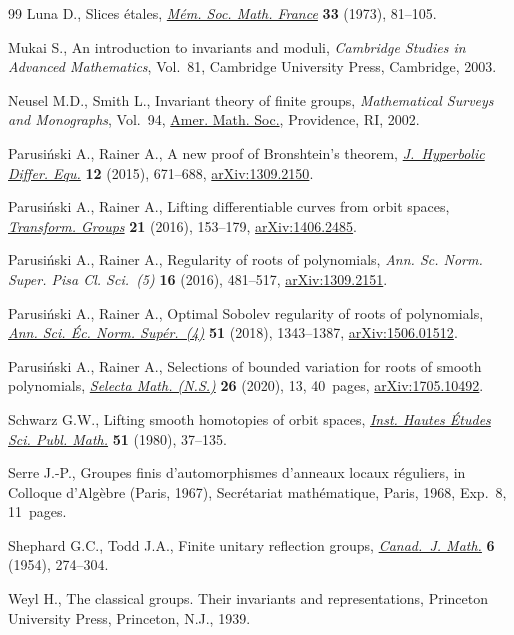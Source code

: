 \documentclass[pdftex]{sigma}
\numberwithin{equation}{section}
\begin{document}
\begin{thebibliography}{99}
Luna D., Slices \'etales, \href{https://doi.org/10.24033/msmf.110}{\textit{M\'em. Soc. Math. France}} \textbf{33} (1973),
 81--105.

Mukai S., An introduction to invariants and moduli, \textit{Cambridge Studies
 in Advanced Mathematics}, Vol.~81, Cambridge University Press, Cambridge,
 2003.

Neusel M.D., Smith L., Invariant theory of finite groups, \textit{Mathematical
 Surveys and Monographs}, Vol.~94, \href{https://doi.org/10.1086/342122}{Amer. Math. Soc.}, Providence, RI, 2002.

Parusi\'nski A., Rainer A., A new proof of {B}ronshtein's theorem,
 \href{https://doi.org/10.1142/S0219891615500198}{\textit{J.~Hyperbolic Differ. Equ.}} \textbf{12} (2015), 671--688,
 \href{https://arxiv.org/abs/1309.2150}{arXiv:1309.2150}.

Parusi\'nski A., Rainer A., Lifting differentiable curves from orbit spaces,
 \href{https://doi.org/10.1007/s00031-015-9346-5}{\textit{Transform. Groups}} \textbf{21} (2016), 153--179, \href{https://arxiv.org/abs/1406.2485}{arXiv:1406.2485}.

Parusi\'nski A., Rainer A., Regularity of roots of polynomials, \textit{Ann.
 Sc. Norm. Super. Pisa Cl. Sci.~(5)} \textbf{16} (2016), 481--517,
 \href{https://arxiv.org/abs/1309.2151}{arXiv:1309.2151}.

Parusi\'nski A., Rainer A., Optimal {S}obolev regularity of roots of
 polynomials, \href{https://doi.org/10.24033/asens.2376}{\textit{Ann. Sci. \'Ec. Norm. Sup\'er.~(4)}} \textbf{51} (2018),
 1343--1387, \href{https://arxiv.org/abs/1506.01512}{arXiv:1506.01512}.

Parusi\'nski A., Rainer A., Selections of bounded variation for roots of smooth
 polynomials, \href{https://doi.org/10.1007/s00029-020-0538-z}{\textit{Selecta Math. (N.S.)}} \textbf{26} (2020), 13, 40~pages,
 \href{https://arxiv.org/abs/1705.10492}{arXiv:1705.10492}.

Schwarz G.W., Lifting smooth homotopies of orbit spaces, \href{https://doi.org/10.1007/BF02684776}{\textit{Inst. Hautes
 \'Etudes Sci. Publ. Math.}} \textbf{51} (1980), 37--135.

Serre J.-P., Groupes finis d'automorphismes d'anneaux locaux r\'eguliers, in
 Colloque d'{A}lg\`ebre ({P}aris, 1967), Secr\'etariat
 math\'ematique, Paris, 1968, {E}xp.~8, 11~pages.

Shephard G.C., Todd J.A., Finite unitary reflection groups, \href{https://doi.org/10.4153/cjm-1954-028-3}{\textit{Canad.~J.
 Math.}} \textbf{6} (1954), 274--304.

Weyl H., The classical groups. {T}heir invariants and representations,
 Princeton University Press, Princeton, N.J., 1939.

\end{thebibliography}\LastPageEnding
\end{document}
